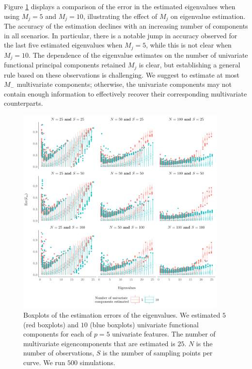 Figure \ref{fig:ncomp} displays a comparison of the error in the estimated eigenvalues when using $M_j = 5$ and $M_j = 10$, illustrating the effect of $M_j$ on eigenvalue estimation. The accuracy of the estimation declines with an increasing number of components in all scenarios. In particular, there is a notable jump in accuracy observed for the last five estimated eigenvalues when $M_j = 5$, while this is not clear when $M_j = 10$. The dependence of the eigenvalue estimates on the number of univariate functional principal components retained $M_j$ is clear, but establishing a general rule based on these observations is challenging. We suggest to estimate at most $M_{-}$ multivariate components; otherwise, the univariate components may not contain enough information to effectively recover their corresponding multivariate counterparts.
\begin{figure}
     \centering
    \includegraphics[width=0.94\textwidth]{figures/ncomp.pdf}
    \caption{Boxplots of the estimation errors of the eigenvalues. We estimated $5$ (red boxplots) and $10$ (blue boxplots) univariate functional components for each of $p = 5$ univariate features. The number of multivariate eigencomponents that are estimated is $25$. $N$ is the number of observations, $S$ is the number of sampling points per curve. We run $500$ simulations.}
    \label{fig:ncomp}
\end{figure}
